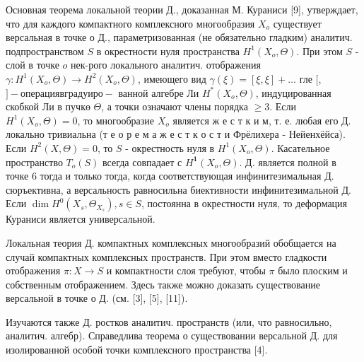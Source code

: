 \documentclass[10pt]{article}
\begin{document}
Основная теорема локальной теории Д., доказанная М. Кураниси [9], утверждает, что для каждого компактного комплексного многообразия $X_{o}$ существует версальная в точке $о$ Д., параметризованная (не обязательно гладким) аналитич. подпространством $S$ в окрестности нуля пространства $H^{1}\left(X_{o}, \Theta\right)$. При этом $S$ - слой в точке $o$ нек-рого локального аналитич. отображения $\gamma: H^{1}\left(X_{o}, \Theta\right) \rightarrow H^{2}\left(X_{o}, \Theta\right)$, имеющего вид $\gamma(\xi)=[\xi, \xi]+\ldots$ гле $[$,$] - операция в градуиро-$ ванной алгебре Ли $H^{*}\left(X_{o}, \Theta\right)$, индуцированная скобкой Ли в пучкө $\Theta$, а точки означают члены порядка $\geqslant 3$. Если $H^{1}\left(X_{o}, \Theta\right)=0$, то многообразие $X_{o}$ является ж е с т к и м, т. е. любая его Д. локально тривиальна (т е о р е м а ж е с т к о с т и Фрёлихера - Нейенхёйса). Если $H^{2}(X, \Theta)=0$, то $S$ - окрестность нуля в $H^{1}\left(X_{o}, \Theta\right)$. Касательное пространство $T_{o}(S)$ всегда совпадает с $H^{\mathbf{1}}\left(X_{o}, \Theta\right)$. Д. является полной в точке 6 тогда и только тогда, когда соответствующая инфинитезимальная Д. сюръективна, а версальность равносильна биективности инфинитезимальной Д. Если $\operatorname{dim} H^{0}\left(X_{s}, \Theta_{X_{s}}\right), s \in S$, постоянна в окрестности нуля, то деформация Кураниси является универсальной.



Локальная теория Д. компактных комплексных многообразий обобщается на случай компактных комплексных пространств. При этом вместо гладкости отображения $\pi: X \rightarrow S$ и компактности слоя требуют, чтобы $\pi$ было плоским и собственным отображением. Здесь также можно доказать существование версальной в точке о Д. (см. [3], [5], [11]).



Изучаются также Д. ростков аналитич. пространств (или, что равносильно, аналитич. алгебр). Справедлива теорема о существовании версальной Д. для изолированной особой точки комплексного пространства [4].
\end{document}
